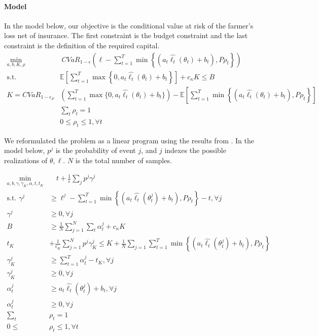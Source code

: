 \documentclass[11pt]{article}
\begin{document}
\paragraph*{Model}
In the model below, our objective is the conditional value at risk of the farmer's loss net of insurance. The first constraint is the budget constraint and the last constraint is the definition of the required capital. 
\begin{align}
  \min_{a,b,K,\rho} &\ CVaR_{1-\epsilon}\left(\ell  - \sum_{t=1}^T \min \left \{(a_t \hat{\ell_t}(\theta_t) + b_t), P\rho_t \right \} \right)\\
  \text{s.t.   } & \mathbb{E}\left [\sum_{t=1}^T \max \left \{0,a_t \hat{\ell_t}(\theta_t) +b_t \right \} \right ] +c_{\kappa} K \leq B\\
   K = CVaR_{1-\epsilon_P} &\left( \sum_{t=1}^T \max \{0,a_t \hat{\ell_t}(\theta_t) +b_t \} \right) - \mathbb{E}\left [\sum_{t=1}^T \min \left \{(a_t \hat{\ell_t}(\theta_t) + b_t), P\rho_t \right \} \right ]\\
   & \sum_t \rho_t = 1\\
   & 0 \leq \rho_t \leq 1, \forall t
\end{align}

We reformulated the problem as a linear program  using the results from \cite{rockafellar2000optimization}. In the model below, $p^j$ is the probability of event $j$, and $j$ indexes the possible realizations of $\theta, \ell$. $N$ is the total number of samples. 
  
  \begin{align}
      \min_{a,b,\gamma,\gamma_K,\alpha,t,t_K} &\quad t + \frac{1}{\epsilon}\sum_j p^j \gamma^j\\
      \text{s.t.   } \gamma^j &\geq \ell^j - \sum_{t=1}^T \min \left \{(a_t \hat{\ell_t}(\theta_t^j) + b_t), P\rho_t \right \} - t, \forall j\\
      \gamma^j &\geq 0, \forall j \\
        B &\geq \frac{1}{N}\sum_{j=1}^N \sum_t \alpha^j_t + c_{\kappa} K\\
        t_K &+ \frac{1}{\epsilon_K} \sum_{j=1}^N p^j \gamma_K^j \leq K+ \frac{1}{N}\sum_{j=1} \sum_{t=1}^T \min \left \{(a_t \hat{\ell_t}(\theta_t^j) + b_t), P\rho_t \right \} \\
        \gamma_K^j &\geq \sum_{t=1}^T \alpha^j_t -t_K, \forall j \\
        \gamma_K^j &\geq 0, \forall j\\
        \alpha^j_t &\geq a_t \hat{\ell_t}(\theta^j_t) + b_t, \forall j\\
        \alpha^j_t &\geq 0, \forall j\\
        \sum_t & \rho_t = 1\\
    0 \leq &\rho_t \leq 1, \forall t
  \end{align}
\end{document}
